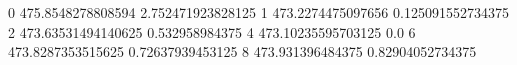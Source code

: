 0 475.8548278808594 2.752471923828125
1 473.2274475097656 0.125091552734375
2 473.63531494140625 0.532958984375
4 473.10235595703125 0.0
6 473.8287353515625 0.72637939453125
8 473.931396484375 0.82904052734375
